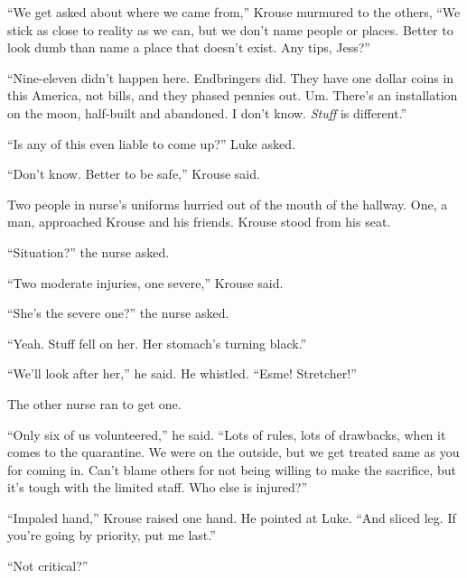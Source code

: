 ``We get asked about where we came from,'' Krouse murmured to the others, ``We stick as close to reality as we can, but we don't name people or places.  Better to look dumb than name a place that doesn't exist.  Any tips, Jess?''



``Nine-eleven didn't happen here.  Endbringers did.  They have one dollar coins in this America, not bills, and they phased pennies out.  Um.  There's an installation on the moon, half-built and abandoned.  I don't know.  \emph{Stuff} is different.''



``Is any of this even liable to come up?'' Luke asked.



``Don't know.  Better to be safe,'' Krouse said.



Two people in nurse's uniforms hurried out of the mouth of the hallway.  One, a man, approached Krouse and his friends.  Krouse stood from his seat.



``Situation?'' the nurse asked.



``Two moderate injuries, one severe,'' Krouse said.



``She's the severe one?'' the nurse asked.



``Yeah.  Stuff fell on her.  Her stomach's turning black.''



``We'll look after her,'' he said.  He whistled.  ``Esme!  Stretcher!''



The other nurse ran to get one.



``Only six of us volunteered,'' he said.  ``Lots of rules, lots of drawbacks, when it comes to the quarantine.  We were on the outside, but we get treated same as you for coming in.  Can't blame others for not being willing to make the sacrifice, but it's tough with the limited staff.  Who else is injured?''



``Impaled hand,'' Krouse raised one hand.  He pointed at Luke.  ``And sliced leg.  If you're going by priority, put me last.''



``Not critical?''



